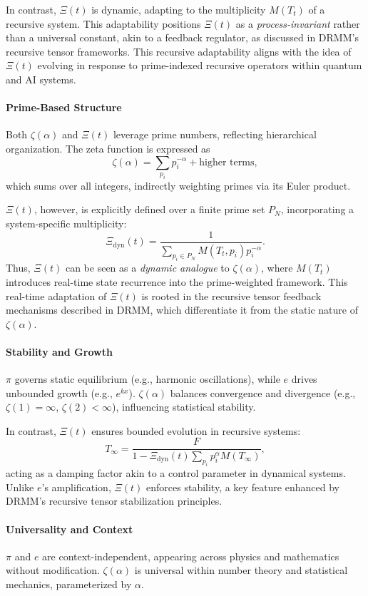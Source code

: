 \documentclass{article}
\theoremstyle{plain}
\begin{document}
In contrast, \(\Xi(t) \) is dynamic, adapting to the multiplicity \( M(T_t) \) of a recursive system. This adaptability positions \(\Xi(t) \) as a \textit{process-invariant} rather than a universal constant, akin to a feedback regulator, as discussed in DRMM's recursive tensor frameworks. This recursive adaptability aligns with the idea of \(\Xi(t) \) evolving in response to prime-indexed recursive operators within quantum and AI systems.

\paragraph{Prime-Based Structure}
Both \( \zeta(\alpha) \) and \(\Xi(t) \) leverage prime numbers, reflecting hierarchical organization. The zeta function is expressed as
\[
\zeta(\alpha) = \sum_{p_i} p_i^{-\alpha} + \text{higher terms},
\]
which sums over all integers, indirectly weighting primes via its Euler product.

\(\Xi(t) \), however, is explicitly defined over a finite prime set \(P_N\), incorporating a system-specific multiplicity:
\[
\Xi_{\text{dyn}}(t) = \frac{1}{\sum_{p_i \in P_N} M(T_t, p_i) p_i^{-\alpha}}.
\]
Thus, \(\Xi(t) \) can be seen as a \textit{dynamic analogue} to \( \zeta(\alpha) \), where \(M(T_t)\) introduces real-time state recurrence into the prime-weighted framework. This real-time adaptation of \(\Xi(t) \) is rooted in the recursive tensor feedback mechanisms described in DRMM, which differentiate it from the static nature of \( \zeta(\alpha) \).

\paragraph{Stability and Growth}
\(\pi\) governs static equilibrium (e.g., harmonic oscillations), while \(e\) drives unbounded growth (e.g., \(e^{kx}\)). \( \zeta(\alpha) \) balances convergence and divergence (e.g., \( \zeta(1) = \infty \), \( \zeta(2) < \infty \)), influencing statistical stability.

In contrast, \(\Xi(t) \) ensures bounded evolution in recursive systems:
\[
T_\infty = \frac{F}{1 - \Xi_{\text{dyn}}(t) \sum_{p_i} p_i^\alpha M(T_\infty)},
\]
acting as a damping factor akin to a control parameter in dynamical systems. Unlike \(e\)'s amplification, \(\Xi(t) \) enforces stability, a key feature enhanced by DRMM's recursive tensor stabilization principles.

\paragraph{Universality and Context}
\(\pi\) and \(e\) are context-independent, appearing across physics and mathematics without modification. \(\zeta(\alpha)\) is universal within number theory and statistical mechanics, parameterized by \( \alpha \).
\end{document}
